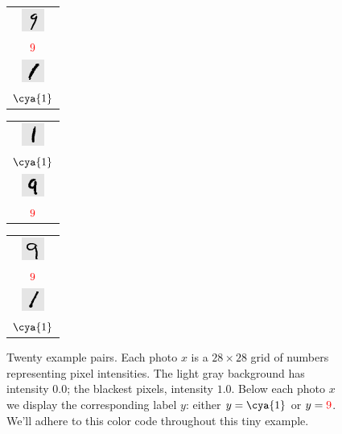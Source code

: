 \begin{figure}
          \begin{tabular}{c}\includegraphics[width=0.75cm]{example-mnist/mnist-trn-07}\\$\red{9}$\\\includegraphics[width=0.75cm]{example-mnist/mnist-trn-17}\\$\cya{1}$\end{tabular}%
          \begin{tabular}{c}\includegraphics[width=0.75cm]{example-mnist/mnist-trn-08}\\$\cya{1}$\\\includegraphics[width=0.75cm]{example-mnist/mnist-trn-18}\\$\red{9}$\end{tabular}%
          \begin{tabular}{c}\includegraphics[width=0.75cm]{example-mnist/mnist-trn-09}\\$\red{9}$\\\includegraphics[width=0.75cm]{example-mnist/mnist-trn-19}\\$\cya{1}$\end{tabular}%
          \caption{
            Twenty example pairs.  Each photo $x$ is a $28\times 28$ grid of
            numbers representing pixel intensities.  The light gray background
            has intensity $0.0$; the blackest pixels, intensity $1.0$.  Below
            each photo $x$ we display the corresponding label $y$:
            either $y= {\cya{1}}$ or
            $y={\red{9}}$.
            We'll adhere to this color code throughout this tiny example.
          }
        \end{figure}

